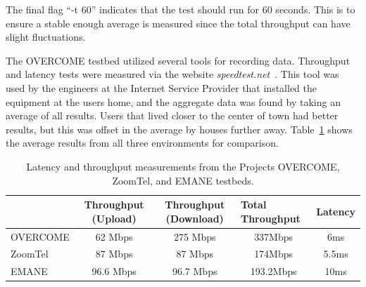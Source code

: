 The final flag ``-t 60'' indicates that the test should run for 60 seconds. This is to ensure a stable enough average is measured since the total throughput can have slight fluctuations.\par
The OVERCOME testbed utilized several tools for recording data.
Throughput and latency tests were measured via the website \textit{speedtest.net}~\cite{speedtest}.
This tool was used by the engineers at the Internet Service Provider that installed the equipment at the users home, and the aggregate data was found by taking an average of all results.
Users that lived closer to the center of town had better results, but this was offset in the average by houses further away.
Table~\ref{chpt3_results} shows the average results from all three environments for comparison.\par

\begin{table}
\centering
\caption{Latency and throughput measurements from the Projects OVERCOME, ZoomTel, and EMANE testbeds.}
\begin{adjustbox}{width=\textwidth, center=\textwidth}
    \begin{tabular}{l|cccc}
    \multicolumn{1}{c|}{} & Throughput (Upload) & Throughput (Download) & \multicolumn{1}{l}{Total Throughput} & Latency \\ 
    \hline
    OVERCOME & 62 Mbps & 275 Mbps & 337Mbps & 6ms \\
    ZoomTel & 87 Mbps & 87 Mbps & 174Mbps & 5.5ms \\
    EMANE & 96.6 Mbps & 96.7 Mbps & 193.2Mbps & 10ms
    \end{tabular}
\end{adjustbox}
\label{chpt3_results}
\end{table}

